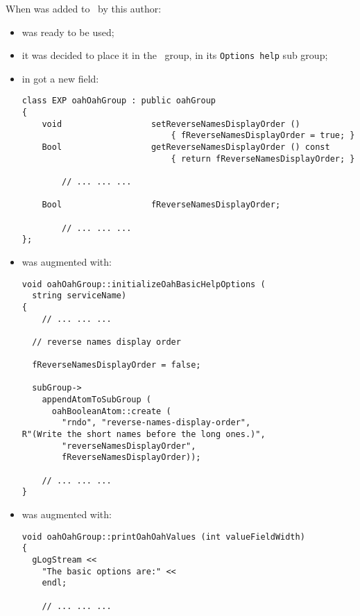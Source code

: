 When  was added to \oahRepr\ by this author:
\begin{itemize}

\item {} was ready to be used;

\item it was decided to place it in the  \oahRepr\ group, in its {\tt Options~help} sub group;

\item {} in  got a new  field:
\begin{lstlisting}[language=CPlusPlus]
class EXP oahOahGroup : public oahGroup
{
    void                  setReverseNamesDisplayOrder ()
                              { fReverseNamesDisplayOrder = true; }
    Bool                  getReverseNamesDisplayOrder () const
                              { return fReverseNamesDisplayOrder; }

		// ... ... ...

    Bool                  fReverseNamesDisplayOrder;

		// ... ... ...
};
\end{lstlisting}

\item {} was augmented with:
\begin{lstlisting}[language=CPlusPlus]
void oahOahGroup::initializeOahBasicHelpOptions (
  string serviceName)
{
	// ... ... ...

  // reverse names display order

  fReverseNamesDisplayOrder = false;

  subGroup->
    appendAtomToSubGroup (
      oahBooleanAtom::create (
        "rndo", "reverse-names-display-order",
R"(Write the short names before the long ones.)",
        "reverseNamesDisplayOrder",
        fReverseNamesDisplayOrder));

	// ... ... ...
}
\end{lstlisting}

\item {} was augmented with:
\begin{lstlisting}[language=CPlusPlus]
void oahOahGroup::printOahOahValues (int valueFieldWidth)
{
  gLogStream <<
    "The basic options are:" <<
    endl;

	// ... ... ...


\end{lstlisting}
\end{itemize}
